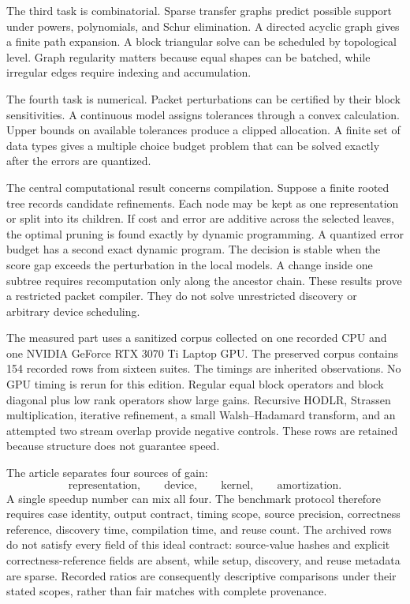 The third task is combinatorial. Sparse transfer graphs predict possible support under powers, polynomials, and Schur elimination. A directed acyclic graph gives a finite path expansion. A block triangular solve can be scheduled by topological level. Graph regularity matters because equal shapes can be batched, while irregular edges require indexing and accumulation.

The fourth task is numerical. Packet perturbations can be certified by their block sensitivities. A continuous model assigns tolerances through a convex calculation. Upper bounds on available tolerances produce a clipped allocation. A finite set of data types gives a multiple choice budget problem that can be solved exactly after the errors are quantized.

The central computational result concerns compilation. Suppose a finite rooted tree records candidate refinements. Each node may be kept as one representation or split into its children. If cost and error are additive across the selected leaves, the optimal pruning is found exactly by dynamic programming. A quantized error budget has a second exact dynamic program. The decision is stable when the score gap exceeds the perturbation in the local models. A change inside one subtree requires recomputation only along the ancestor chain. These results prove a restricted packet compiler. They do not solve unrestricted discovery or arbitrary device scheduling.

The measured part uses a sanitized corpus collected on one recorded CPU and one NVIDIA GeForce RTX 3070 Ti Laptop GPU. The preserved corpus contains 154 recorded rows from sixteen suites. The timings are inherited observations. No GPU timing is rerun for this edition. Regular equal block operators and block diagonal plus low rank operators show large gains. Recursive HODLR, Strassen multiplication, iterative refinement, a small Walsh--Hadamard transform, and an attempted two stream overlap provide negative controls. These rows are retained because structure does not guarantee speed.

The article separates four sources of gain:
\[
\text{representation},
\qquad
\text{device},
\qquad
\text{kernel},
\qquad
\text{amortization}.
\]
A single speedup number can mix all four. The benchmark protocol therefore requires case identity, output contract, timing scope, source precision, correctness reference, discovery time, compilation time, and reuse count. The archived rows do not satisfy every field of this ideal contract: source-value hashes and explicit correctness-reference fields are absent, while setup, discovery, and reuse metadata are sparse. Recorded ratios are consequently descriptive comparisons under their stated scopes, rather than fair matches with complete provenance.

